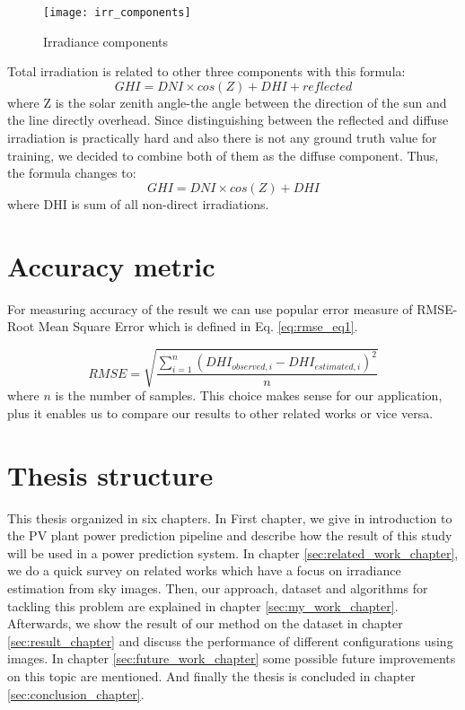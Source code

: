 \begin{figure}[h]
\caption{Irradiance components}
\label{fig:irr_comps}
\texttt{[image: irr\_components]}
\centering
\end{figure} 

Total irradiation is related to other three components with this formula:
\[ GHI = DNI \times cos (Z) + DHI + reflected \]
where Z is the solar zenith angle-the angle between the direction of the sun and the line directly overhead.
Since distinguishing between the reflected and diffuse irradiation is practically hard and also there is not any ground truth value for training, we decided to combine both of them as the diffuse component. Thus, the formula changes to:
\begin{equation}
\label{eq:irr_components}
GHI = DNI \times cos (Z) + DHI
\end{equation}
where DHI is sum of all non-direct irradiations.

\section{Accuracy metric}
For measuring accuracy of the result we can use popular error measure of RMSE-Root Mean Square Error which is defined in Eq. \ref{eq:rmse_eq1}.

\begin{equation}
\label{eq:rmse_eq1}
RMSE = \sqrt{\frac{\sum_{i=1}^{n}{(DHI_{observed, i} - DHI_{estimated ,i})^2}}{n}}
\end{equation}
where $n$ is the number of samples. This choice makes sense for our application, plus it enables us to compare our results to other related works or vice versa.

\section{Thesis structure}
This thesis organized in six chapters. In First chapter, we give in introduction to the PV plant power prediction pipeline and describe how the result of this study will be used in a power prediction system. In chapter \ref{sec:related_work_chapter}, we do a quick survey on related works which have a focus on irradiance estimation from sky images. Then, our approach, dataset and algorithms for tackling this problem are explained in chapter \ref{sec:my_work_chapter}. Afterwards, we show the result of our method on the dataset in chapter \ref{sec:result_chapter} and discuss the performance of different configurations using images. In chapter \ref{sec:future_work_chapter} some possible future improvements on this topic are mentioned. And finally the thesis is concluded in chapter \ref{sec:conclusion_chapter}.

